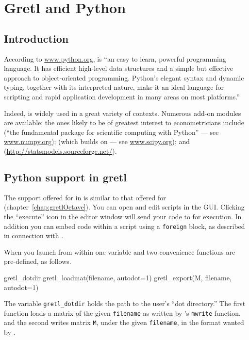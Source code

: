 \chapter{Gretl and Python}
\label{chap:gretlPython}

\section{Introduction}
\label{Python-intro}

According to \url{www.python.org},  is ``an easy to learn,
powerful programming language. It has efficient high-level data
structures and a simple but effective approach to object-oriented
programming. Python's elegant syntax and dynamic typing, together with
its interpreted nature, make it an ideal language for scripting and
rapid application development in many areas on most platforms.''

Indeed,  is widely used in a great variety of
contexts. Numerous add-on modules are available; the ones likely to be
of greatest interest to econometricians include  (``the
fundamental package for scientific computing with Python'' --- see
\url{www.numpy.org});  (which builds on  --- see
\url{www.scipy.org}); and 
(\url{http://statsmodels.sourceforge.net/}).

\section{Python support in gretl}
\label{sec:Python-support}

The support offered for  in  is similar to that
offered for  (chapter~\ref{chap:gretlOctave}). You can
open and edit  scripts in the  GUI.  Clicking
the ``execute'' icon in the editor window will send your code to
 for execution. In addition you can embed 
code within a  script using a \texttt{foreign} block, as
described in connection with .

When you launch  from within  one variable and
two convenience functions are pre-defined, as follows.
\begin{code}
gretl_dotdir
gretl_loadmat(filename, autodot=1)
gretl_export(M, filename, autodot=1)
\end{code}
The variable \verb|gretl_dotdir| holds the path to the user's ``dot
directory.''  The first function loads a matrix of the given
\texttt{filename} as written by 's \texttt{mwrite}
function, and the second writes matrix \texttt{M}, under the given
\texttt{filename}, in the format wanted by .

